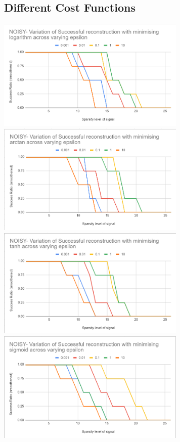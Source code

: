 \documentclass[a4paper,14pt]{article}
\numberwithin{definition}{section}
\numberwithin{mytheorem}{subsection}
\begin{document}
\subsection{Different Cost Functions}

\begin{center}
    \includegraphics[width=9cm]{log_epsilon_noisy.png}
    \includegraphics[width=9cm]{atan_epsilon_noisy.png}
    \includegraphics[width=9cm]{tanh_epsilon_noisy.png}
    \includegraphics[width=9cm]{sigmoid_epsilon_noisy.png}
\end{center}
\end{document}
